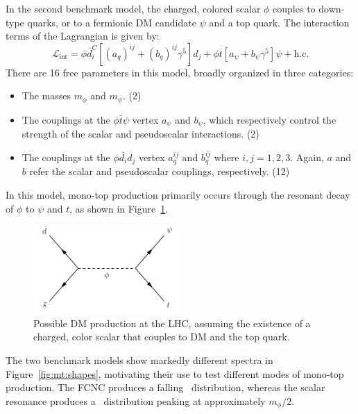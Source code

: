 In the second benchmark model, the charged, colored scalar $\phi$ couples to down-type quarks, or to a fermionic DM candidate $\psi$ and a top quark.
The interaction terms of the Lagrangian is given by:
\begin{equation}
    \mathcal{L}_\text{int} = \phi\overline{{d}}_i^C[(a_{q})^{ij}+(b_{q})^{ij}\gamma^5]{d}_j+\phi\overline{{t}}[a_{\psi}+b_{\psi}\gamma^5]\psi+\text{h.c.}
\end{equation}
There are 16 free parameters in this model, broadly organized in three categories:
\begin{itemize}
    \item The masses $m_\phi$ and $m_\psi$. (2)
    \item The couplings at the $\phi \bar{t} \psi$ vertex $a_\psi$ and $b_\psi$, which respectively control the strength of the scalar and pseudoscalar interactions. (2)
    \item The couplings at the $\phi \bar{d_i} d_j$ vertex $a_q^{ij}$ and $b_q^{ij}$ where $i,j=1,2,3$. Again, $a$ and $b$ refer the scalar and pseudoscalar couplings, respectively. (12)
\end{itemize}
In this model, mono-top production primarily occurs through the resonant decay of $\phi$ to $\psi$ and $t$, as shown in Figure~\ref{fig:mt:resdiag}.

\begin{figure}[]
    \begin{center}
        \includegraphics[width=0.5\textwidth]{figures/monotop/diagrams/resonant.pdf}
        \caption{Possible DM production at the LHC, assuming the existence of a charged, color scalar that couples to DM and the top quark.}
        \label{fig:mt:resdiag}
    \end{center}
\end{figure}

The two benchmark models show markedly different spectra in Figure~\ref{fig:mt:shapes}, motivating their use to test different modes of mono-top production.
The FCNC produces a falling \ptmiss~distribution, whereas the scalar resonance produces a \ptmiss~distribution peaking at approximately $m_\phi / 2$. 

